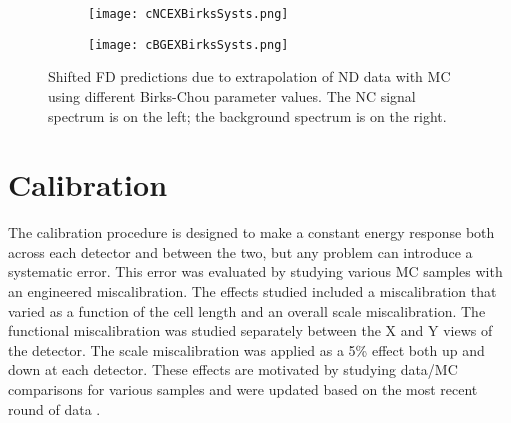 \begin{doublespace}
\begin{figure}[h]
  \centering
  \begin{subfigure}{.48\textwidth}
    \centering
    \texttt{[image: cNCEXBirksSysts.png]}
  \end{subfigure}
  \begin{subfigure}{.48\textwidth}
    \centering
    \texttt{[image: cBGEXBirksSysts.png]}
  \end{subfigure}
  \caption[Birks-Chou Shifted FD Predictions]{Shifted FD predictions due to extrapolation of ND data with MC using different Birks-Chou parameter values. The NC signal spectrum is on the left; the background spectrum is on the right.}
  \label{fig:SystBirks}
\end{figure}

\section{Calibration}

The calibration procedure is designed to make a constant energy response both across each detector and between the two, but any problem can introduce a systematic error. This error was evaluated by studying various MC samples with an engineered miscalibration. The effects studied included a miscalibration that varied as a function of the cell length and an overall scale miscalibration. The functional miscalibration was studied separately between the X and Y views of the detector. The scale miscalibration was applied as a 5\% effect both up and down at each detector. These effects are motivated by studying data/MC comparisons for various samples \cite{ref:CalibTN, ref:CalibMESA, ref:CalibPi0SA} and were updated based on the most recent round of data \cite{ref:CalibSA}.


\end{doublespace}
